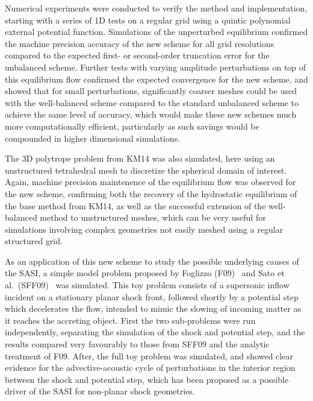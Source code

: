 Numerical experiments were conducted to verify the method and implementation, starting with a series of 1D tests on a regular grid using a quintic polynomial external potential function. Simulations of the unperturbed equilibrium confirmed the machine precision accuracy of the new scheme for all grid resolutions compared to the expected first- or second-order truncation error for the unbalanced scheme. Further tests with varying amplitude perturbations on top of this equilibrium flow confirmed the expected convergence for the new scheme, and showed that for small perturbations, significantly coarser meshes could be used with the well-balanced scheme compared to the standard unbalanced scheme to achieve the same level of accuracy, which would make these new schemes much more computationally efficient, particularly as such savings would be compounded in higher dimensional simulations.

The 3D polytrope problem from KM14 was also simulated, here using an unstructured tetrahedral mesh to discretize the spherical domain of interest. Again, machine precision maintenence of the equilibrium flow was observed for the new scheme, confirming both the recovery of the hydrostatic equilibrium of the base method from KM14, as well as the successful extension of the well-balanced method to unstructured meshes, which can be very useful for simulations involving complex geometries not easily meshed using a regular structured grid.

As an application of this new scheme to study the possible underlying causes of the SASI, a simple model problem proposed by Foglizzo (F09)~\cite{Foglizzo2009} and Sato et al.\ (SFF09)~\cite{Sato2009} was simulated. This toy problem consists of a supersonic inflow incident on a stationary planar shock front, followed shortly by a potential step which decelerates the flow, intended to mimic the slowing of incoming matter as it reaches the accreting object. First the two sub-problems were run independently, separating the simulation of the shock and potential step, and the results compared very favourably to those from SFF09 and the analytic treatment of F09. After, the full toy problem was simulated, and showed clear evidence for the advective-acoustic cycle of perturbations in the interior region between the shock and potential step, which has been proposed as a possible driver of the SASI for non-planar shock geometries.